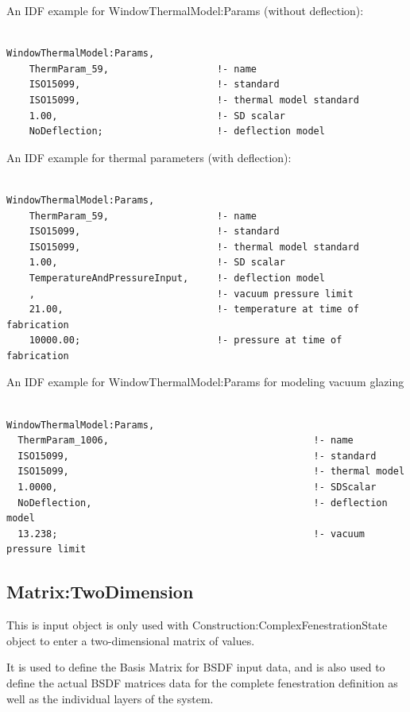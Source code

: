 An IDF example for WindowThermalModel:Params (without deflection):

\begin{lstlisting}

WindowThermalModel:Params,
    ThermParam_59,                   !- name
    ISO15099,                        !- standard
    ISO15099,                        !- thermal model standard
    1.00,                            !- SD scalar
    NoDeflection;                    !- deflection model
\end{lstlisting}

An IDF example for thermal parameters (with deflection):

\begin{lstlisting}

WindowThermalModel:Params,
    ThermParam_59,                   !- name
    ISO15099,                        !- standard
    ISO15099,                        !- thermal model standard
    1.00,                            !- SD scalar
    TemperatureAndPressureInput,     !- deflection model
    ,                                !- vacuum pressure limit
    21.00,                           !- temperature at time of fabrication
    10000.00;                        !- pressure at time of fabrication
\end{lstlisting}

An IDF example for WindowThermalModel:Params for modeling vacuum glazing

\begin{lstlisting}

WindowThermalModel:Params,
  ThermParam_1006,                                    !- name
  ISO15099,                                           !- standard
  ISO15099,                                           !- thermal model
  1.0000,                                             !- SDScalar
  NoDeflection,                                       !- deflection model
  13.238;                                             !- vacuum pressure limit
\end{lstlisting}

\subsection{Matrix:TwoDimension}\label{matrixtwodimension}

This is input object is only used with Construction:ComplexFenestrationState object to enter a two-dimensional matrix of values.

It is used to define the Basis Matrix for BSDF input data, and is also used to define the actual BSDF matrices data for the complete fenestration definition as well as the individual layers of the system.

